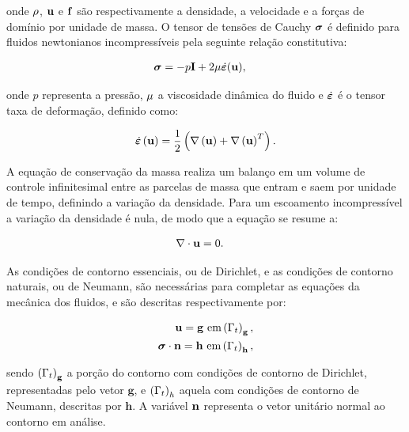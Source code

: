 \documentclass[tese_patricia]{subfiles}%
\begin{document}
\noindent onde $\rho$, $\mathbf{u}$ e $\mathbf{f}$ são respectivamente a densidade, a velocidade e a forças de domínio por unidade de massa. O tensor de tensões de Cauchy $\boldsymbol{\sigma}$ é definido para fluidos newtonianos incompressíveis pela seguinte relação constitutiva:

\begin{align}
\boldsymbol{\sigma} &= -p\mathbf{I} + 2\mu\dot{\bm{\varepsilon}}(\mathbf{u}),\label{eq:StressTensor}
\end{align}

\noindent onde $p$ representa a pressão, $\mu$ a viscosidade dinâmica do fluido e $\dot{\bm{\varepsilon}}$ é o tensor taxa de deformação, definido como:

\begin{align}
\dot{\bm{\varepsilon}}\left(\mathbf{u}\right) = \frac{1}{2}\left(\nabla\left(\mathbf{u}\right) + \nabla\left(\mathbf{u}\right)^{T}\right). 
\label{eq:StrainTensor}
\end{align}

A equação de conservação da massa realiza um balanço em um volume de controle infinitesimal entre as parcelas de massa que entram e saem por unidade de tempo, definindo a variação da densidade. Para um escoamento incompressível a variação da densidade é nula, de modo que a equação se resume a:

\begin{align}
\nabla \cdot \mathbf{u} &= 0. 
\end{align}

As condições de contorno essenciais, ou de Dirichlet, e as condições de contorno naturais, ou de Neumann, são necessárias para completar as equações da mecânica dos fluidos, e são descritas respectivamente por:

\begin{align}
\mathbf{u} = \mathbf{g} \textrm { em} \left(\Gamma_{t}\right)_{\mathbf{g}} \label{eq:Dir},\\
\boldsymbol{\sigma} \cdot \mathbf{n} = \mathbf{h} \textrm{ em} \left(\Gamma_{t}\right)_{\mathbf{h}}, \label{eq:Neu}
\end{align}

\noindent sendo $\left(\Gamma_{t}\right)_{\mathbf{g}}$ a porção do contorno com condições de contorno de Dirichlet, representadas pelo vetor $\mathbf{g}$, e $\left(\Gamma_{t}\right)_{h}$ aquela com condições de contorno de Neumann, descritas por $\mathbf{h}$. A variável $\mathbf{n}$ representa o vetor unitário normal ao contorno em análise.
\end{document}
